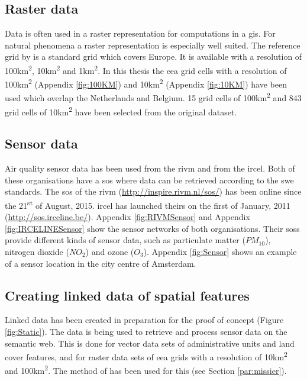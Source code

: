 \subsection{Raster data}
Data is often used in a raster representation for computations in a \ac{gis}. For natural phenomena a raster representation is especially well suited. The reference grid by \cite{DATA:EEA} is a standard grid which covers Europe. It is available with a resolution of 100km\textsuperscript{2}, 10km\textsuperscript{2} and 1km\textsuperscript{2}. In this thesis the \ac{eea} grid cells with a resolution of 100km\textsuperscript{2} (Appendix \ref{fig:100KM}) and 10km\textsuperscript{2} (Appendix \ref{fig:10KM}) have been used which overlap the Netherlands and Belgium. 15 grid cells of 100km\textsuperscript{2} and 843 grid cells of 10km\textsuperscript{2} have been selected from the original dataset.  

\subsection{Sensor data}
\label{sensor}
\begin{sloppypar}
Air quality sensor data has been used from the \acf{rivm} and from the \acf{ircel}. Both of these organisations have a \ac{sos} where data can be retrieved according to the \ac{swe} standards. The \ac{sos} of the \ac{rivm} (\url{http://inspire.rivm.nl/sos/}) has been online since the 21\textsuperscript{st} of August, 2015. \ac{ircel} has launched theirs on the first of January, 2011 (\url{http://sos.irceline.be/}). Appendix \ref{fig:RIVMSensor} and Appendix \ref{fig:IRCELINESensor} show the sensor networks of both organisations. Their \aclp{sos} provide different kinds of sensor data, such as particulate matter ($PM_{10}$), nitrogen dioxide ($NO_{2}$) and ozone ($O_{3}$). Appendix \ref{fig:Sensor} shows an example of a sensor location in the city centre of Amsterdam. 
\end{sloppypar}

\subsection{Creating linked data of spatial features}
\label{linked}
Linked data has been created in preparation for the proof of concept (Figure \ref{fig:Static}). The data is being used to retrieve and process sensor data on the semantic web. This is done for vector data sets of administrative units and land cover features, and for raster data sets of \ac{eea} grids with a resolution of 10km\textsuperscript{2} and 100km\textsuperscript{2}. The method of \cite{LD:Missier} has been used for this (see Section \ref{par:missier}).

